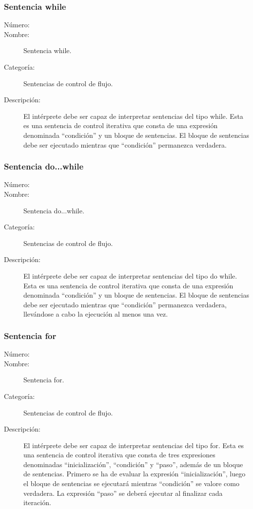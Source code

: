 \subsubsection{Sentencia while}
\begin{framed}
	\begin{description}
		\item [Número:] \cn
		\item [Nombre:] Sentencia while.
		\item [Categoría:] Sentencias de control de flujo.
		\item [Descripción:] El intérprete debe ser capaz de interpretar sentencias del tipo while. Esta es una sentencia de control
		iterativa que consta de una expresión denominada ``condición'' y un bloque de sentencias. El bloque de sentencias debe ser ejecutado
	    mientras que ``condición'' permanezca verdadera.
	\end {description}
\end{framed}

\subsubsection{Sentencia do...while}
\begin{framed}
	\begin{description}
		\item [Número:] \cn
		\item [Nombre:] Sentencia do...while.
		\item [Categoría:] Sentencias de control de flujo.
		\item [Descripción:] El intérprete debe ser capaz de interpretar sentencias del tipo do while. Esta es una sentencia de control
		iterativa que consta de una expresión denominada ``condición'' y un bloque de sentencias. El bloque de sentencias debe ser ejecutado
	    mientras que ``condición'' permanezca verdadera, llevándose a cabo la ejecución al menos una vez.
	\end {description}
\end{framed}

\subsubsection{Sentencia for}
\begin{framed}
	\begin{description}
		\item [Número:] \cn
		\item [Nombre:] Sentencia for.
		\item [Categoría:] Sentencias de control de flujo.
		\item [Descripción:] El intérprete debe ser capaz de interpretar sentencias del tipo for. Esta es una sentencia de control
		iterativa que consta de tres expresiones denominadas ``inicialización'', ``condición'' y ``paso'', además de un bloque de sentencias.
		Primero se ha de evaluar la expresión ``inicialización'', luego el bloque de sentencias se ejecutará mientras ``condición'' se
		valore como verdadera. La expresión ``paso'' se deberá ejecutar al finalizar cada iteración.  
	\end {description}
\end{framed}

